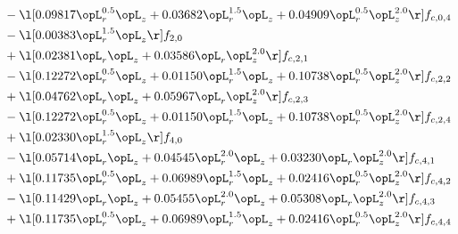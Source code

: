 \begin{alignat}{2}
& - \l[  0.09817 \opL_r^{0.5} \opL_z +  0.03682 \opL_r^{1.5} \opL_z +  0.04909 \opL_r^{0.5} \opL_z^{2.0}  \r] f_{c,0,4} \nonumber \\ 
& - \l[  0.00383 \opL_r^{1.5} \opL_z  \r] f_{2,0} \nonumber \\ 
& + \l[  0.02381 \opL_r \opL_z +  0.03586 \opL_r \opL_z^{2.0}  \r] f_{c,2,1} \nonumber \\ 
& - \l[  0.12272 \opL_r^{0.5} \opL_z +  0.01150 \opL_r^{1.5} \opL_z +  0.10738 \opL_r^{0.5} \opL_z^{2.0}  \r] f_{c,2,2} \nonumber \\ 
& + \l[  0.04762 \opL_r \opL_z +  0.05967 \opL_r \opL_z^{2.0}  \r] f_{c,2,3} \nonumber \\ 
& - \l[  0.12272 \opL_r^{0.5} \opL_z +  0.01150 \opL_r^{1.5} \opL_z +  0.10738 \opL_r^{0.5} \opL_z^{2.0}  \r] f_{c,2,4} \nonumber \\ 
& + \l[  0.02330 \opL_r^{1.5} \opL_z  \r] f_{4,0} \nonumber \\ 
& - \l[  0.05714 \opL_r \opL_z +  0.04545 \opL_r^{2.0} \opL_z +  0.03230 \opL_r \opL_z^{2.0}  \r] f_{c,4,1} \nonumber \\ 
& + \l[  0.11735 \opL_r^{0.5} \opL_z +  0.06989 \opL_r^{1.5} \opL_z +  0.02416 \opL_r^{0.5} \opL_z^{2.0}  \r] f_{c,4,2} \nonumber \\ 
& - \l[  0.11429 \opL_r \opL_z +  0.05455 \opL_r^{2.0} \opL_z +  0.05308 \opL_r \opL_z^{2.0}  \r] f_{c,4,3} \nonumber \\ 
& + \l[  0.11735 \opL_r^{0.5} \opL_z +  0.06989 \opL_r^{1.5} \opL_z +  0.02416 \opL_r^{0.5} \opL_z^{2.0}  \r] f_{c,4,4} \nonumber \\ 
\end{alignat} 


